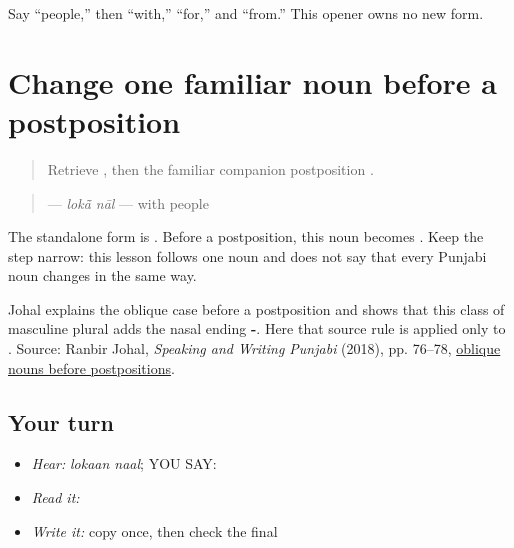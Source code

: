 \begin{tcolorbox}[breakable,colback=teal!4,colframe=teal!35!black,title={Before you move on}]
Say “people,” then “with,” “for,” and “from.” This opener owns no new form.
\end{tcolorbox}
\section[\texorpdfstring{\pa{ਲੋਕਾਂ} (lokaan)}{ਲੋਕਾਂ (lokaan)}]{Change one familiar noun before a postposition}

\label{lesson:PA-C192-lokaan}



\begin{quote}
Retrieve \textbf{}, then the familiar companion postposition \textbf{}.
\end{quote}

\begin{grammarlens}[title={Grammar Lens: direct owner}]
\begin{quote}
\textbf{ } — \emph{lokā̃ nāl} — with people
\end{quote}

The standalone form is \textbf{}. Before a postposition, this noun becomes \textbf{}. Keep the step narrow: this lesson follows one noun and does not say that every Punjabi noun changes in the same way.
\end{grammarlens}

\begin{grammarlens}[title={Grammar Lens: source boundary}]
Johal explains the oblique case before a postposition and shows that this class of masculine plural adds the nasal ending \textbf{-}. Here that source rule is applied only to \textbf{}. Source: Ranbir Johal, \emph{Speaking and Writing Punjabi} (2018), pp. 76–78, \href{https://openlibrary-repo.ecampusontario.ca/jspui/bitstream/123456789/492/2/2018Pun1100CoursePackage.pdf}{oblique nouns before postpositions}.
\end{grammarlens}

\subsection*{Your turn}
\begin{itemize}
\raggedright
  \item \emph{Hear:} \emph{lokaan naal}; YOU SAY: \textbf{ }
  \item \emph{Read it:} \textbf{ }
  \item \emph{Write it:} copy \textbf{} once, then check the final \textbf{}
\end{itemize}

